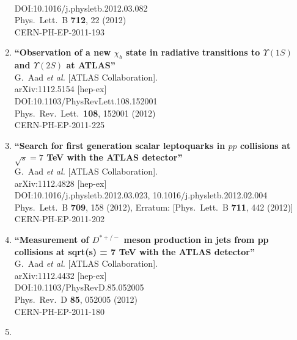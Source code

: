 \documentclass{article}
\begin{document}
\begin{enumerate}
  \\{}DOI:10.1016/j.physletb.2012.03.082
  \\{}Phys.\ Lett.\ B {\bf 712}, 22 (2012)
  \\{}CERN-PH-EP-2011-193
\item%
{\bf ``Observation of a new $\chi_b$ state in radiative transitions to $\Upsilon(1S)$ and $\Upsilon(2S)$ at ATLAS''}
  \\{}G.~Aad {\it et al.} [ATLAS Collaboration].
  \\{}arXiv:1112.5154 [hep-ex]
  \\{}DOI:10.1103/PhysRevLett.108.152001
  \\{}Phys.\ Rev.\ Lett.\  {\bf 108}, 152001 (2012)
  \\{}CERN-PH-EP-2011-225
\item%
{\bf ``Search for first generation scalar leptoquarks in $pp$ collisions at $\sqrt{s}=7$ TeV with the ATLAS detector''}
  \\{}G.~Aad {\it et al.} [ATLAS Collaboration].
  \\{}arXiv:1112.4828 [hep-ex]
  \\{}DOI:10.1016/j.physletb.2012.03.023, 10.1016/j.physletb.2012.02.004
  \\{}Phys.\ Lett.\ B {\bf 709}, 158 (2012), Erratum: [Phys.\ Lett.\ B {\bf 711}, 442 (2012)]
  \\{}CERN-PH-EP-2011-202
\item%
{\bf ``Measurement of $D^{*+/-}$ meson production in jets from pp collisions at sqrt(s) = 7 TeV with the ATLAS detector''}
  \\{}G.~Aad {\it et al.} [ATLAS Collaboration].
  \\{}arXiv:1112.4432 [hep-ex]
  \\{}DOI:10.1103/PhysRevD.85.052005
  \\{}Phys.\ Rev.\ D {\bf 85}, 052005 (2012)
  \\{}CERN-PH-EP-2011-180
\item%

\end{enumerate}
\end{document}
